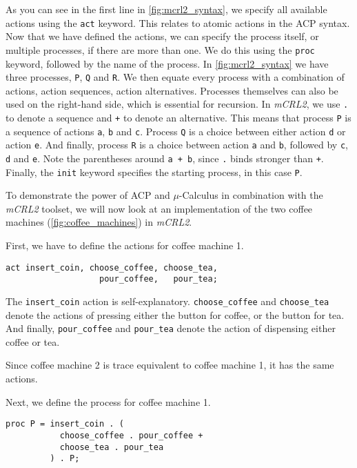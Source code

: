 \documentclass{clseminar}
\begin{document}
  As you can see in the first line in \autoref{fig:mcrl2_syntax}, we specify all available actions using the \texttt{act} keyword. This relates to atomic actions in the ACP syntax. Now that we have defined the actions, we can specify the process itself, or multiple processes, if there are more than one. We do this using the \texttt{proc} keyword, followed by the name of the process. In \autoref{fig:mcrl2_syntax} we have three processes, \texttt{P}, \texttt{Q} and \texttt{R}. We then equate every process with a combination of actions, action sequences, action alternatives. Processes themselves can also be used on the right-hand side, which is essential for recursion. In \textit{mCRL2}, we use \texttt{.} to denote a sequence and \texttt{+} to denote an alternative. This means that process \texttt{P} is a sequence of actions \texttt{a}, \texttt{b} and \texttt{c}. Process \texttt{Q} is a choice between either action \texttt{d} or action \texttt{e}. And finally, process \texttt{R} is a choice between action \texttt{a} and \texttt{b}, followed by \texttt{c}, \texttt{d} and \texttt{e}. Note the parentheses around \texttt{a + b}, since \texttt{.} binds stronger than \texttt{+}. Finally, the \texttt{init} keyword specifies the starting process, in this case \texttt{P}.

  To demonstrate the power of ACP and $\mu$-Calculus in combination with the \textit{mCRL2} toolset, we will now look at an implementation of the two coffee machines (\autoref{fig:coffee_machines}) in \textit{mCRL2}.

  First, we have to define the actions for coffee machine 1.

  \begin{lstlisting}[language=mCRL2]
act insert_coin, choose_coffee, choose_tea,
                   pour_coffee,   pour_tea;
  \end{lstlisting}

  The \texttt{insert\_coin} action is self-explanatory. \texttt{choose\_coffee} and \texttt{choose\_tea} denote the actions of pressing either the button for coffee, or the button for tea. And finally, \texttt{pour\_coffee} and \texttt{pour\_tea} denote the action of dispensing either coffee or tea.

  Since coffee machine 2 is trace equivalent to coffee machine 1, it has the same actions.

  Next, we define the process for coffee machine 1.

  \begin{lstlisting}[language=mCRL2]
proc P = insert_coin . (
           choose_coffee . pour_coffee +
           choose_tea . pour_tea
         ) . P;
  \end{lstlisting}
\end{document}
